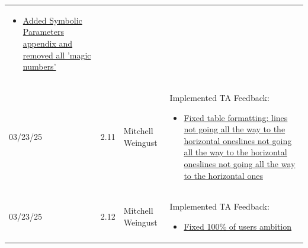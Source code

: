 \documentclass[12pt]{article}
\begin{document}
\begin{table}[H]
\begin{tabularx}{\textwidth}{p{1.5cm} p{1cm} p{3.5cm} X}
\begin{itemize}[leftmargin=*]
        \item \href{https://github.com/parishanizam/TeleHealth/issues/187}{Added Symbolic Parameters appendix and removed all 'magic numbers'}
      \end{itemize} \\
      03/23/25 & 2.11 & Mitchell Weingust & Implemented TA Feedback: 
      \begin{itemize}[leftmargin=*]
        \item \href{https://github.com/parishanizam/TeleHealth/issues/188}{Fixed table formatting: lines not going all the way to the horizontal oneslines not going all the way to the horizontal oneslines not going all the way to the horizontal ones}
      \end{itemize} \\
      03/23/25 & 2.12 & Mitchell Weingust & Implemented TA Feedback: 
      \begin{itemize}[leftmargin=*]
        \item \href{https://github.com/parishanizam/TeleHealth/issues/195}{Fixed 100\% of users ambition}
      \end{itemize} \\
    \end{tabularx}
  \end{table}
\end{document}
